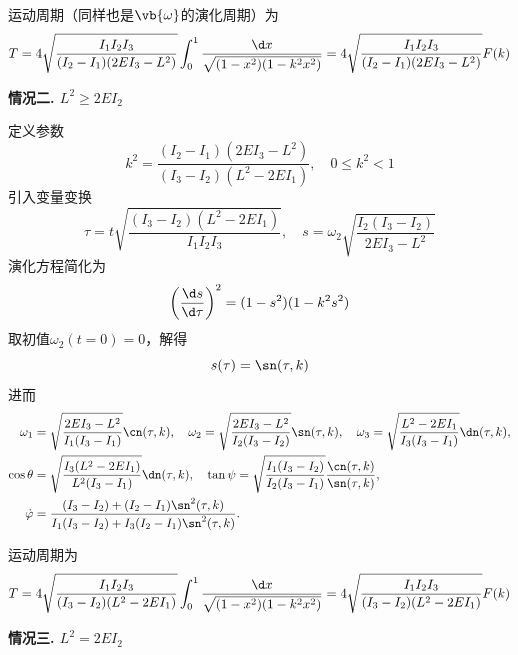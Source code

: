 运动周期（同样也是\(\vb{\omega}\)的演化周期）为
\begin{equation*}
	T = 4\sqrt{\frac{I_1I_2I_3}{(I_2-I_1)(2EI_3-L^2)}}\int_0^1\frac{\d x}{\sqrt{(1-x^2)(1-k^2x^2)}}= 4\sqrt{\frac{I_1I_2I_3}{(I_2-I_1)(2EI_3-L^2)}}F(k)
\end{equation*}

\textbf{情况二.  \(L^2 \geq 2EI_2\)}

定义参数
\begin{equation*}
	k^2 = \frac{(I_2-I_1)(2EI_3-L^2)}{(I_3-I_2)(L^2-2EI_1)}, \quad 0 \leq k^2 < 1
\end{equation*}
引入变量变换
\begin{equation*}
	\tau = t\sqrt{\frac{(I_3-I_2)(L^2-2EI_1)}{I_1I_2I_3}}, \quad
	s = \omega_2\sqrt{\frac{I_2(I_3-I_2)}{2EI_3-L^2}}
\end{equation*}
演化方程简化为
\begin{equation*}
	\left(\frac{\d s}{\d \tau}\right)^2 = (1-s^2)(1-k^2s^2)
\end{equation*}
取初值\(\omega_2(t=0)=0\)，解得
\begin{equation*}
	s(\tau) = \sn(\tau,k)
\end{equation*}
进而
\begin{align*}
	\omega_1      & = \sqrt{\frac{2EI_3-L^2}{I_1(I_3-I_1)}}\cn(\tau,k),\quad
	\omega_2=\sqrt{\frac{2EI_3-L^2}{I_2(I_3-I_2)}} \sn(\tau,k),\quad
	\omega_3 = \sqrt{\frac{L^2-2EI_1}{I_3(I_3-I_1)}}\dn(\tau,k),                                       \\
	\cos\theta    & = \sqrt{\frac{I_3(L^2-2EI_1)}{L^2(I_3-I_1)}}\dn(\tau,k) ,\quad
	\tan\psi = \sqrt{\frac{I_1(I_3-I_2)}{I_2(I_3-I_1)}}\frac{\cn(\tau,k)}{\sn(\tau,k)} ,               \\
	\dot{\varphi} & = \frac{(I_3-I_2)+(I_2-I_1)\sn^2(\tau,k)}{I_1(I_3-I_2)+I_3(I_2-I_1)\sn^2(\tau,k)}.
\end{align*}

运动周期为
\begin{equation*}
	T = 4 \sqrt{\frac{I_1 I_2 I_3}{(I_3 - I_2)(L^2 - 2EI_1)}} \int_0^1 \frac{\d x}{\sqrt{(1-x^2)(1-k^2 x^2)}}= 4 \sqrt{\frac{I_1 I_2 I_3}{(I_3 - I_2)(L^2 - 2EI_1)}} F(k)
\end{equation*}

\textbf{情况三.  \(L^2 = 2EI_2\)}

